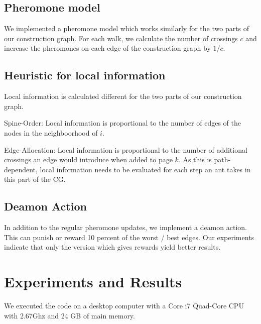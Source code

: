 \documentclass{scrartcl}
\begin{document}
\subsection{Pheromone model}
We implemented a pheromone model which works similarly for the two
parts of our construction graph. For each walk, we calculate the
number of crossings $c$ and increase the pheromones on each edge of the
construction graph by $1/c$.

\subsection{Heuristic for local information}
\label{local_information}

Local information is calculated different for the two parts of our construction graph.

\begin{description}

    \item{Spine-Order}: Local information is proportional to the number of edges of the
      nodes in the neighboorhood of $i$.              

    \item{Edge-Allocation}: Local information is proportional to the number of additional
      crossings an edge would introduce when added to page $k$. As this is path-dependent, local
      information needs to be evaluated for each step an ant takes in this part of the CG.
\end{description}

\subsection{Deamon Action}
\label{Deamon Action}
In addition to the regular pheromone updates, we implement a deamon
action. This can punish or reward 10 percent of the worst / best
edges. Our experiments indicate that only the version which gives
rewards yield better results.


\section{Experiments and Results}
We executed the code on a desktop computer with a Core i7 Quad-Core
CPU with 2.67Ghz and 24 GB of main memory. \\
\end{document}
